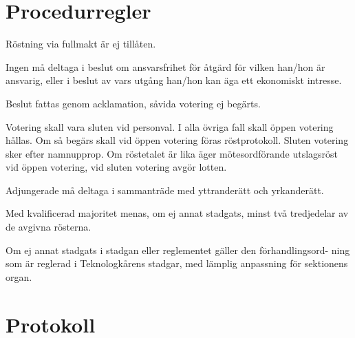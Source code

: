 \documentclass[stadgar]{dsekprotokoll}
\begin{document}
\section{Procedurregler}

\begin{stadgeavsnitt}


Röstning via fullmakt är ej tillåten.


Ingen må deltaga i beslut om ansvarsfrihet för åtgärd för vilken han/hon är
ansvarig, eller i beslut av vars utgång han/hon kan äga ett ekonomiskt
intresse.


Beslut fattas genom acklamation, såvida votering ej begärts.


Votering skall vara sluten vid personval. I alla övriga fall skall öppen
votering hållas. Om så begärs skall vid öppen votering föras röstprotokoll.
Sluten votering sker efter namnupprop. Om röstetalet är lika äger
mötesordförande utslagsröst vid öppen votering, vid sluten votering avgör
lotten.


Adjungerade må deltaga i sammanträde med yttranderätt och yrkanderätt.


Med kvalificerad majoritet menas, om ej annat stadgats, minst två
tredjedelar av de avgivna rösterna.


Om ej annat stadgats i stadgan eller reglementet gäller den förhandlingsord- ning som är reglerad i Teknologkårens stadgar, med lämplig anpassning för sektionens organ.

\end{stadgeavsnitt}

\section{Protokoll}
\end{document}
